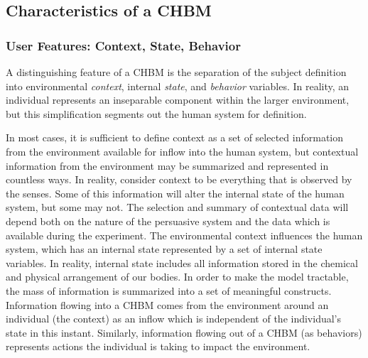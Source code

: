 \documentclass[runningheads,a4paper]{llncs}
\begin{document}
\subsection{Characteristics of a CHBM}
\subsubsection{User Features: Context, State, Behavior}
A distinguishing feature of a CHBM is the separation of the subject definition into environmental \emph{context}, internal \emph{state}, and \emph{behavior} variables.
In reality, an individual represents an inseparable component within the larger environment, but this simplification segments out the human system for definition.

In most cases, it is sufficient to define context as a set of selected information from the environment available for inflow into the human system, but contextual information from the environment may be summarized and represented in countless ways.
In reality, consider context to be everything that is observed by the senses. 
Some of this information will alter the internal state of the human system, but some may not. 
The selection and summary of contextual data will depend both on the nature of the persuasive system and the data which is available during the experiment.
The environmental context influences the human system, which has an internal state represented by a set of internal state variables.
In reality, internal state includes all information stored in the chemical and physical arrangement of our bodies. 
In order to make the model tractable, the mass of information is summarized into a set of meaningful constructs.
Information flowing into a CHBM comes from the environment around an individual (the context) as an inflow which is independent of the individual's state in this instant.
Similarly, information flowing out of a CHBM (as behaviors) represents actions the individual is taking to impact the environment.
\end{document}
